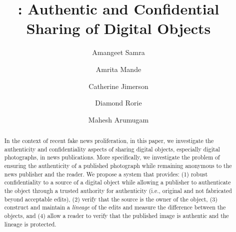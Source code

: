 \documentclass[10pt,letterpaper]{article}
\title{\name: Authentic and Confidential Sharing of Digital Objects}
\author{Amangeet Samra}
\author{Amrita Mande}
\author{Catherine Jimerson}
\author{Diamond Rorie}
\author{Mahesh Arumugam}
\affil[]{W233 Project Group \#2}
\date{}
\begin{document}
\maketitle

\begin{abstract}
    In the context of recent fake news proliferation, in this paper, we investigate the authenticity and confidentiality aspects of sharing digital objects, especially digital photographs, in news publications. More specifically, we investigate the problem of ensuring the authenticity of a published photograph while remaining anonymous to the news publisher and the reader. We propose a system that provides: (1) robust confidentiality to a source of a digital object while allowing a publisher to authenticate the object through a trusted authority for authenticity (i.e., original and not fabricated beyond acceptable edits), (2) verify that the source is the owner of the object, (3) construct and maintain a {\em lineage} of the edits and measure the difference between the objects, and (4) allow a reader to verify that the published image is authentic and the lineage is protected. 
\end{abstract}








{\small


}


\end{document}
